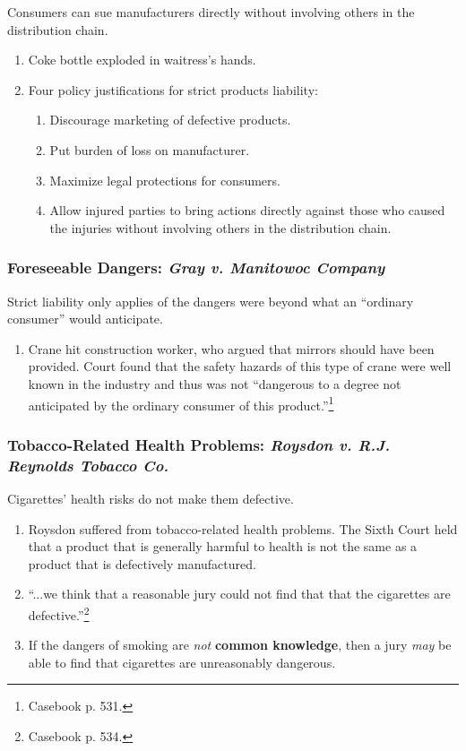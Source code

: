 Consumers can sue manufacturers directly without involving others in the 
distribution chain.

\begin{enumerate}
    \item Coke bottle exploded in waitress's hands.
    \item Four policy justifications for strict products liability:
    \begin{enumerate}
        \item Discourage marketing of defective products.
        \item Put burden of loss on manufacturer.
        \item Maximize legal protections for consumers.
        \item Allow injured parties to bring actions directly against those who 
        caused the injuries without involving others in the distribution chain.
    \end{enumerate}
\end{enumerate}

\subsubsection{Foreseeable Dangers: \emph{Gray v. Manitowoc Company}}

Strict liability only applies of the dangers were beyond what an ``ordinary 
consumer'' would anticipate.

\begin{enumerate}
    \item Crane hit construction worker, who argued that mirrors should have 
    been provided. Court found that the safety hazards of this type of crane 
    were well known in the industry and thus was not ``dangerous to a degree not 
    anticipated by the ordinary consumer of this product.''\footnote{Casebook p. 
    531.}
\end{enumerate}

\subsubsection{Tobacco-Related Health Problems: \emph{Roysdon v. R.J. Reynolds 
Tobacco Co.}}

Cigarettes' health risks do not make them defective.

\begin{enumerate}
    \item Roysdon suffered from tobacco-related health problems. The Sixth 
    Court held that a product that is generally harmful to health is not the 
    same as a product that is defectively manufactured.
    \item ``...we think that a reasonable jury could not find that that the 
    cigarettes are defective.''\footnote{Casebook p. 534.}
    \item If the dangers of smoking are \emph{not} \textbf{common knowledge}, 
    then a jury \emph{may} be able to find that cigarettes are unreasonably 
    dangerous.
\end{enumerate}

